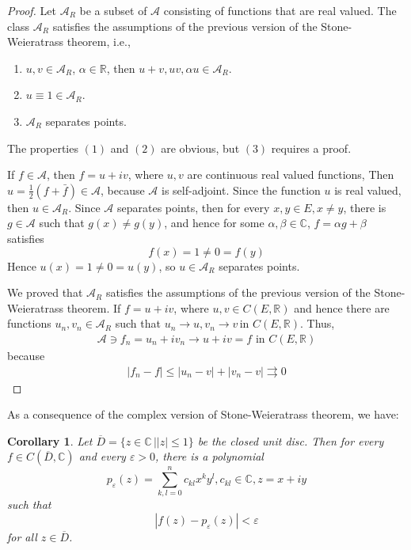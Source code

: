 \documentclass[12pt,leqno]{amsart}
\newtheorem{corollary}{Corollary}[theorem]
\theoremstyle{definition}
\numberwithin{equation}{subsection}
\begin{document}
\begin{proof}
Let $\mathcal{A}_R$ be a subset of $\mathcal{A}$ consisting of functions that are real valued. The class $\mathcal{A}_R$ satisfies the assumptions of the previous version of the Stone-Weieratrass theorem, i.e.,
\begin{enumerate}
    \item $u,v\in\mathcal{A}_R$, $\alpha\in\mathbb{R}$, then $u+v,uv,\alpha u\in\mathcal{A}_R$.
    \item $u\equiv 1 \in \mathcal{A}_R$.
    \item $\mathcal{A}_R$ separates points.
\end{enumerate}
The properties $(1)$ and $(2)$ are obvious, but $(3)$ requires a proof.

If $f\in\mathcal{A}$, then $f = u+iv$, where $u,v$ are continuous real valued functions, Then $u = \frac{1}{2}(f+\bar{f})\in\mathcal{A}$, because $\mathcal{A}$ is self-adjoint. Since the function $u$ is real valued, then $u\in\mathcal{A}_R$. Since $\mathcal{A}$ separates points, then for every $x,y\in E, x\neq y$, there is $g\in\mathcal{A}$ such that $g(x)\neq g(y)$, and hence for some $\alpha, \beta\in\mathbb{C}$, $f = \alpha g+\beta$ satisfies $$f(x) = 1\neq 0 = f(y)$$
Hence $u(x) = 1\neq 0 = u(y)$, so $u\in\mathcal{A}_R$ separates points.

We proved that $\mathcal{A}_R$ satisfies the assumptions of the previous version of the Stone-Weieratrass theorem. If $f = u+iv$, where $u,v\in C(E,\mathbb{R})$ and hence there are functions $u_n,v_n\in \mathcal{A}_R$ such that $u_n\to u, v_n\to v \, \text{in}\,\, C(E,\mathbb{R})$. Thus, 
\begin{align*}
    \mathcal{A}\ni f_n = u_n + iv_n \to u+iv = f\,\, \text{in}\,\, C(E,\mathbb{R})
\end{align*}
because 
\begin{align*}
    \left|f_n - f\right| \leq \left|u_n - v\right| + \left|v_n - v\right| \rightrightarrows 0
\end{align*}
\end{proof}

\medskip

As a consequence of the complex version of Stone-Weieratrass theorem, we have:
\begin{corollary}
Let $\overline{D} = \{z\in \mathbb{C} \,| \left|z\right|\leq 1\}$ be the closed unit disc. Then for every $f\in C(\overline{D}, \mathbb{C})$ and every $\varepsilon > 0$, there is a polynomial 
$$p_\varepsilon(z) = \sum^n_{k,l=0}c_{kl}x^k y^l, c_{kl}\in\mathbb{C}, z = x+iy$$
such that 
$$\left|f(z) - p_\varepsilon(z)\right| < \varepsilon$$
for all $z\in\overline{D}$.
\end{corollary}
\end{document}
